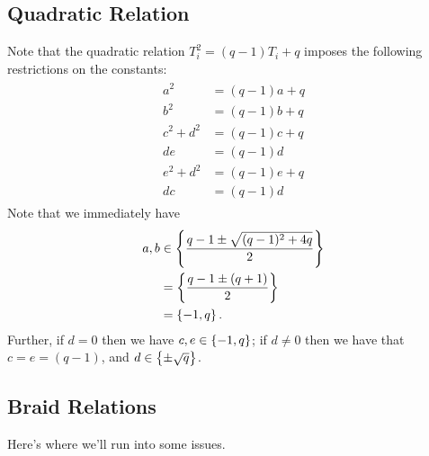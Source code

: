 \documentclass{amsart}
\begin{document}
\subsection{Quadratic Relation}
Note that the quadratic relation $T_i^2 = (q -1)T_i + q$ imposes the following restrictions on the constants:
\begin{align}
  \begin{split}
  a^2 &= (q-1)a + q\\
  b^2 &= (q-1)b + q\\
  c^2 + d^2 &= (q -1)c + q\\
  de &= (q-1)d\\
  e^2 + d^2 &= (q -1)e + q\\
  dc &= (q-1)d
\end{split}
  \label{Quadratic}
\end{align}
Note that we immediately have
\begin{align}
  \begin{split}
  a,b &\in \left\{ \frac{q - 1 \pm \sqrt{(q-1)^2 + 4q}}{2} \right\}\\
  &= \left\{ \frac{q - 1 \pm (q + 1)}{2} \right\}\\
  &= \left\{ -1,q \right\}.
\end{split}
\label{ab}
\end{align}
Further, if $d = 0$ then we have $c,e \in \left\{ -1,q \right\}$;
if $d \neq 0$ then we have that $c = e = (q - 1)$, and $d \in \left\{ \pm \sqrt{q} \right\}$.
   
\subsection{Braid Relations}
Here's where we'll run into some issues.
\end{document}
